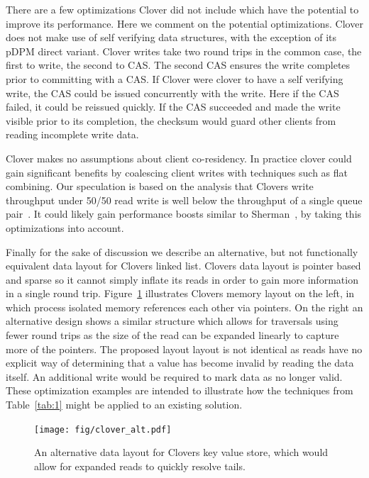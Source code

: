 There are a few optimizations Clover did not include which have the potential to
improve its performance. Here we comment on the potential optimizations. Clover
does not make use of self verifying data structures, with the exception of its
pDPM direct variant. Clover writes take two round trips in the common case, the
first to write, the second to CAS. The second CAS ensures the write completes prior to
committing with a CAS.  If Clover were clover to have a self verifying write,
the CAS could be issued concurrently with the write. Here if the CAS failed, it
could be reissued quickly. If the CAS succeeded and made the write visible prior
to its completion, the checksum would guard other clients from reading
incomplete write data. 

Clover makes no assumptions about client co-residency. In practice clover could
gain significant benefits by coalescing client writes with techniques such as
flat combining. Our speculation is based on the analysis that Clovers write
throughput under 50/50 read write is well below the throughput of a single queue
pair~\cite{design-guidelines}. It could likely gain performance boosts similar
to Sherman~\cite{sherman}, by taking this optimizations into account. 

Finally for the sake of discussion we describe an alternative, but not
functionally equivalent data layout for Clovers linked list. Clovers data layout
is pointer based and sparse so it cannot simply inflate its reads in order to
gain more information in a single round trip. Figure~\ref{fig:clover_alt}
illustrates Clovers memory layout on the left, in which process isolated memory
references each other via pointers. On the right an alternative design shows a
similar structure which allows for traversals using fewer round trips as the
size of the read can be expanded linearly to capture more of the pointers. The
proposed layout layout is not identical as reads have no explicit way of
determining that a value has become invalid by reading the data itself. An
additional write would be required to mark data as no longer valid. These
optimization examples are intended to illustrate how the techniques from
Table~\ref{tab:1} might be applied to an existing solution.

\begin{figure}
    \texttt{[image: fig/clover\_alt.pdf]}

    \caption{An alternative data layout for Clovers key value store, which would
    allow for expanded reads to quickly resolve tails.}

    \label{fig:clover_alt}
\end{figure}


